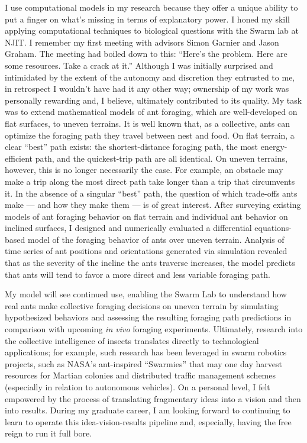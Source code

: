 I use computational models in my research because they offer a unique ability to put a finger on what's missing in terms of explanatory power.
I honed my skill applying computational techniques to biological questions with the Swarm lab at NJIT.
I remember my first meeting with advisors Simon Garnier and Jason Graham.
The meeting had boiled down to this:
``Here's the problem.
Here are some resources.
Take a crack at it.''
Although I was initially surprised and intimidated by the extent of the autonomy and discretion they entrusted to me, in retrospect I wouldn't have had it any other way;
ownership of my work was personally rewarding and, I believe, ultimately contributed to its quality.
My task was to extend mathematical models of ant foraging, which are well-developed on flat surfaces, to uneven terrains.
It is well known that, as a collective, ants can optimize the foraging path they travel between nest and food.
On flat terrain, a clear ``best'' path exists: the shortest-distance foraging path, the most energy-efficient path, and the quickest-trip path are all identical.
On uneven terrains, however, this is no longer necessarily the case.
For example, an obstacle may make a trip along the most direct path take longer than a trip that circumvents it.
In the absence of a singular ``best'' path, the question of which trade-offs ants make --- and how they make them --- is of great interest.
After surveying existing models of ant foraging behavior on flat terrain and individual ant behavior on inclined surfaces, I designed and numerically evaluated a differential equations-based model of the foraging behavior of ants over uneven terrain.
Analysis of time series of ant positions and orientations generated via simulation revealed that as the severity of the incline the ants traverse increases, the model predicts that ants will tend to favor a more direct and less variable foraging path.

My model will see continued use, enabling the Swarm Lab to understand how real ants make collective foraging decisions on uneven terrain by simulating hypothesized behaviors and assessing the resulting foraging path predictions in comparison with upcoming \textit{in vivo} foraging experiments.
Ultimately, research into the collective intelligence of insects translates directly to technological applications;
for example, such research has been leveraged in swarm robotics projects, such as NASA's ant-inspired ``Swarmies'' that may one day harvest resources for Martian colonies and distributed traffic management schemes (especially in relation to autonomous vehicles).
On a personal level, I felt empowered by the process of translating fragmentary ideas into a vision and then into results.
During my graduate career, I am looking forward to continuing to learn to operate this idea-vision-results pipeline and, especially, having the free reign to run it full bore.

